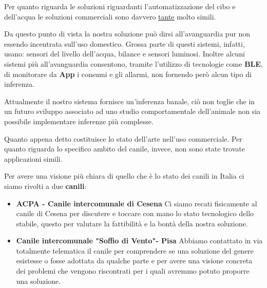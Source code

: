 Per quanto riguarda le soluzioni riguardanti l'automatizzazione del cibo e dell'acqua le soluzioni commerciali sono davvero \href{https://www.fruugo.it/alimentatore-automatico-per-animali-domestici-a-43-l-capacita-alimentatore-intelligente-per-alimentazione-intelligente-per-lalimentazione-del-tempo-e-razionale-con-telecamera-telecomandato-tipo-di-lusso/p-55093501-111996468?language=it&ac=croud}{tante} molto simili.

Da questo punto di vista la nostra soluzione può dirsi all'avanguardia pur non essendo incentrata sull'uso domestico. Grossa parte di questi sistemi, infatti, usano: sensori del livello dell'acqua, bilance e sensori luminosi.
Inoltre alcuni sistemi più all'avanguardia consentono, tramite l'utilizzo di tecnologie come \textbf{BLE}, di monitorare da \textbf{App} i consumi e gli allarmi, non fornendo però alcun tipo di inferenza.

Attualmente il nostro sistema fornisce un'inferenza banale, ciò non toglie che in un futuro sviluppo associato ad uno studio comportamentale dell'animale non sia possibile implementare inferenze più complesse.

Quanto appena detto costituisce lo stato dell'arte nell'uso commerciale.
Per quanto riguarda lo specifico ambito del canile, invece, non sono state trovate applicazioni simili.

Per avere una visione più chiara di quello che è lo stato dei canili in Italia ci siamo rivolti a due \textbf{canili}:
\begin{itemize}
    \item \textbf{ACPA - Canile intercomunale di Cesena} Ci siamo recati fisicamente al canile di Cesena per discutere e toccare con mano lo stato tecnologico dello stabile, questo per valutare la fattibilità e la bontà della nostra soluzione.
    \item \textbf{Canile intercomunale "Soffio di Vento"- Pisa} Abbiamo contattato in via totalmente telematica il canile per comprendere se una soluzione del genere esistesse o fosse adottata da qualche parte e per avere una visione concreta dei problemi che vengono riscontrati per i quali avremmo potuto proporre una soluzione.
\end{itemize}

